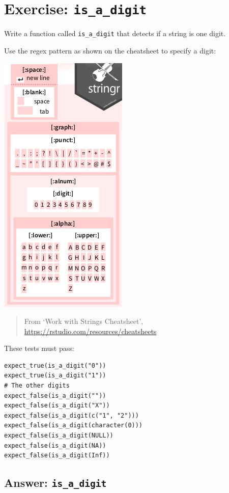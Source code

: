 \documentclass[]{book}
\begin{document}
\hypertarget{exercise-is_a_digit}{%
\section{\texorpdfstring{Exercise: \texttt{is\_a\_digit}}{Exercise: is\_a\_digit}}\label{exercise-is_a_digit}}

Write a function called \texttt{is\_a\_digit} that detects if a string is one digit.

Use the regex pattern as shown on the cheatsheet to specify a digit:

\includegraphics{06_character_sets.png}

\begin{quote}
From `Work with Strings Cheatsheet', \url{https://rstudio.com/resources/cheatsheets}
\end{quote}

These tests must pass:

\begin{verbatim}
expect_true(is_a_digit("0"))
expect_true(is_a_digit("1"))
# The other digits
expect_false(is_a_digit(""))
expect_false(is_a_digit("X"))
expect_false(is_a_digit(c("1", "2")))
expect_false(is_a_digit(character(0)))
expect_false(is_a_digit(NULL))
expect_false(is_a_digit(NA))
expect_false(is_a_digit(Inf))
\end{verbatim}

\hypertarget{answer-is_a_digit}{%
\subsection{\texorpdfstring{Answer: \texttt{is\_a\_digit}}{Answer: is\_a\_digit}}\label{answer-is_a_digit}}
\end{document}
